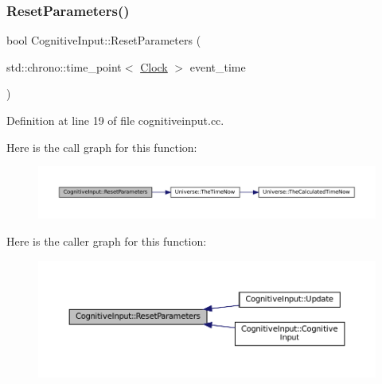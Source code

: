 \subsubsection{\texorpdfstring{Reset\+Parameters()}{ResetParameters()}}
{\footnotesize\ttfamily bool Cognitive\+Input\+::\+Reset\+Parameters (\begin{DoxyParamCaption}\item[{std\+::chrono\+::time\+\_\+point$<$ \mbox{\hyperlink{universe_8h_a0ef8d951d1ca5ab3cfaf7ab4c7a6fd80}{Clock}} $>$}]{event\+\_\+time }\end{DoxyParamCaption})}



Definition at line 19 of file cognitiveinput.\+cc.

Here is the call graph for this function\+:\nopagebreak
\begin{figure}[H]
\begin{center}
\leavevmode
\includegraphics[width=350pt]{class_cognitive_input_a943605b820cc279533e19d24e11405c6_cgraph}
\end{center}
\end{figure}
Here is the caller graph for this function\+:\nopagebreak
\begin{figure}[H]
\begin{center}
\leavevmode
\includegraphics[width=350pt]{class_cognitive_input_a943605b820cc279533e19d24e11405c6_icgraph}
\end{center}
\end{figure}
\mbox{\label{class_cognitive_input_a4f09c1f176b5406d95a14d7cb1ab75e6}} 
